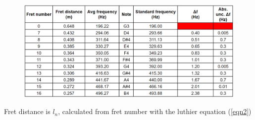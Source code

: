 \begin{figure}[!htb]
    \includegraphics[width = \textwidth]{./ee/processed_table.png}
\end{figure}
\FloatBarrier
Fret distance is $l_n$, calculated from fret number with the luthier equation (\ref{eqn2})
